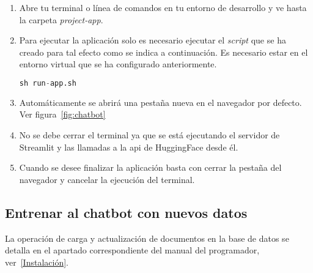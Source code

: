 \begin{enumerate}
\item Abre tu terminal o línea de comandos en tu entorno de desarrollo y ve hasta la carpeta \textit{project-app}.

\item Para ejecutar la aplicación solo es necesario ejecutar el \textit{script} que se ha creado para tal efecto como se indica a continuación. Es necesario estar en el entorno virtual que se ha configurado anteriormente.

\begin{lstlisting}[language=Python, caption=Ejecutar la aplicación.]
    sh run-app.sh
\end{lstlisting}

\item Automáticamente se abrirá una pestaña nueva en el navegador por defecto. Ver figura~\ref{fig:chatbot}

\item No se debe cerrar el terminal ya que se está ejecutando el servidor de Streamlit y las llamadas a la \acrshort{api} de HuggingFace desde él.

\item Cuando se desee finalizar la aplicación basta con cerrar la pestaña del navegador y cancelar la ejecución del terminal.  
\end{enumerate}


\subsection{Entrenar al chatbot con nuevos datos}

La operación de carga y actualización de documentos en la base de datos se detalla en el apartado correspondiente del manual del programador, ver~\ref{Instalación}.